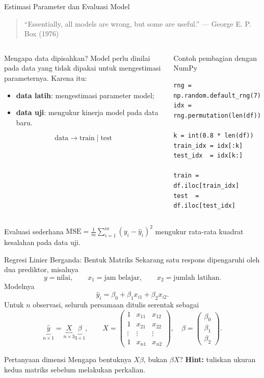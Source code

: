 \documentclass[aspectratio=169,11pt]{beamer}
\begin{document}
\begin{frame}[fragile]{Estimasi Parameter dan Evaluasi Model}
\begin{quote}
``Essentially, all models are wrong, but some are useful.''
\hfill --- George E. P. Box \scriptsize (1976)
\end{quote}
\vspace{-2mm}
\begin{columns}[T]
\begin{block}{Mengapa data dipisahkan?}
\small
Model perlu dinilai pada data yang tidak dipakai untuk mengestimasi parameternya. Karena itu:
\begin{itemize}
  \item \textbf{data latih}: mengestimasi parameter model;
  \item \textbf{data uji}: mengukur kinerja model pada data baru.
\end{itemize}
\[
\text{data} \longrightarrow \text{train} \;|\; \text{test}
\]
\end{block}
\begin{block}{Contoh pembagian dengan NumPy}
\begin{lstlisting}
rng = np.random.default_rng(7)
idx = rng.permutation(len(df))

k = int(0.8 * len(df))
train_idx = idx[:k]
test_idx  = idx[k:]

train = df.iloc[train_idx]
test  = df.iloc[test_idx]
\end{lstlisting}
\end{block}
\end{columns}
\begin{alertblock}{Evaluasi sederhana}
$\displaystyle \mathrm{MSE}=\frac{1}{m}\sum_{i=1}^{m}(y_i-\hat y_i)^2$ mengukur rata-rata kuadrat kesalahan pada data uji.
\end{alertblock}
\end{frame}

\begin{frame}{Regresi Linier Berganda: Bentuk Matriks}
\small
Sekarang satu respons dipengaruhi oleh dua prediktor, misalnya
\[
y=\text{nilai},\qquad x_1=\text{jam belajar},\qquad x_2=\text{jumlah latihan}.
\]
Modelnya
\[
\hat y_i=\beta_0+\beta_1x_{i1}+\beta_2x_{i2}.
\]
Untuk $n$ observasi, seluruh persamaan ditulis serentak sebagai
\[
\underbrace{\hat y}_{n\times1}
=
\underbrace{X}_{n\times3}
\underbrace{\beta}_{3\times1},
\qquad
X=
\begin{pmatrix}
1&x_{11}&x_{12}\\
1&x_{21}&x_{22}\\
\vdots&\vdots&\vdots\\
1&x_{n1}&x_{n2}
\end{pmatrix},
\quad
\beta=\begin{pmatrix}\beta_0\\\beta_1\\\beta_2\end{pmatrix}.
\]
\begin{alertblock}{Pertanyaan dimensi}
Mengapa bentuknya $X\beta$, bukan $\beta X$? \textbf{Hint:} tuliskan ukuran kedua matriks sebelum melakukan perkalian.
\end{alertblock}
\end{frame}
\end{document}
